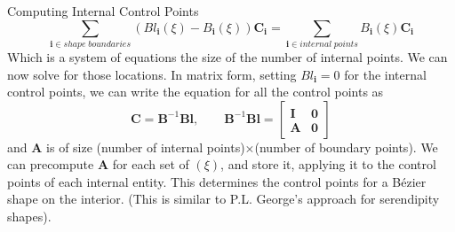 \documentclass[12pt]{beamer}
\begin{document}
\begin{frame}{Computing Internal Control Points}
 \[\displaystyle \sum_{\mathbf{i} \in shape\;boundaries}(Bl_{\mathbf{i}}(\xi)-B_\mathbf{i}(\xi))\mathbf{C}_\mathbf{i} = \displaystyle \sum_{\mathbf{i} \in internal\;points} B_\mathbf{i}(\xi)\mathbf{C}_{\mathbf{i}} \]
 Which is a system of equations the size of the number of internal points. We can now solve for those locations. In matrix form, setting $Bl_\mathbf{i} = 0$ for the internal control points, we can write the equation for all the control points as
\[\mathbf{C} = \mathbf{B}^{-1}\mathbf{Bl}, \qquad \mathbf{B}^{-1}\mathbf{Bl} = \left[\begin{array}{cc}\mathbf{I} & \mathbf{0} \\ \mathbf{A}  &\mathbf{0} \end{array}\right] \]
and $\mathbf{A}$ is of size (number of internal points)$\times$(number of boundary points). We can precompute $\mathbf{A}$ for each set of $(\xi)$, and store it, applying it to the control points of each internal entity. This determines the control points for a B{\'ezier} shape on the interior. (This is similar to P.L. George's approach for serendipity shapes).

\end{frame}
\end{document}
